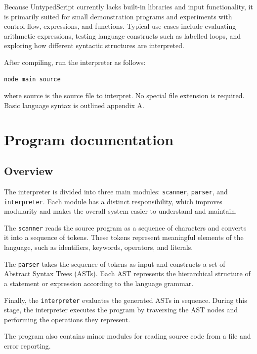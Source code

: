 \documentclass[12pt,a4paper]{article}
\begin{document}
Because UntypedScript currently lacks built-in libraries and input functionality, it is primarily suited for small demonstration programs and experiments with control flow, expressions, and functions. Typical use cases include evaluating arithmetic expressions, testing language constructs such as labelled loops, and exploring how different syntactic structures are interpreted.

After compiling, run the interpreter as follows:
\begin{lstlisting}
node main source
\end{lstlisting}
where source is the source file to interpret. No special file extension is required. Basic language syntax is outlined appendix A.

\section{Program documentation}
\subsection{Overview}

The interpreter is divided into three main modules: \texttt{scanner}, \texttt{parser}, and \texttt{interpreter}. Each module has a distinct responsibility, which improves modularity and makes the overall system easier to understand and maintain.

The \texttt{scanner} reads the source program as a sequence of characters and converts it into a sequence of tokens. These tokens represent meaningful elements of the language, such as identifiers, keywords, operators, and literals.

The \texttt{parser} takes the sequence of tokens as input and constructs a set of Abstract Syntax Trees (ASTs). Each AST represents the hierarchical structure of a statement or expression according to the language grammar.

Finally, the \texttt{interpreter} evaluates the generated ASTs in sequence. During this stage, the interpreter executes the program by traversing the AST nodes and performing the operations they represent.

The program also contains minor modules for reading source code from a file and error reporting.
\end{document}
